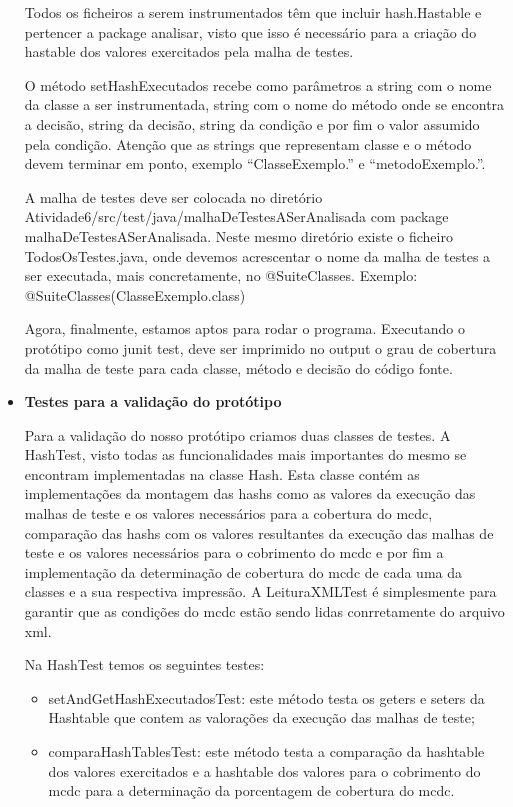 \documentclass[a4paper,11pt]{article}
\newcommand{\sepitem}{\vspace{0.1in}\item}
\begin{document}
\begin{itemize}
Todos os ficheiros a serem instrumentados têm que incluir hash.Hastable e pertencer a package analisar, 
visto que isso é necessário para a criação do hastable dos valores exercitados pela malha de testes.

O método setHashExecutados recebe como parâmetros a string com o nome da classe a ser instrumentada, 
string com o nome do método onde se encontra a decisão, string da decisão, string da condição e por fim 
o valor assumido pela condição. Atenção que as strings que representam classe e o método devem terminar 
em ponto, exemplo ``ClasseExemplo.'' e ``metodoExemplo.''.

A malha de testes deve ser colocada no diretório Atividade6/src/test/java/malhaDeTestesASerAnalisada com 
package malhaDeTestesASerAnalisada. Neste mesmo diretório existe o ficheiro TodosOsTestes.java, onde devemos
acrescentar o nome da malha de testes a ser executada, mais concretamente, no @SuiteClasses. Exemplo: 
@SuiteClasses({ClasseExemplo.class})

Agora, finalmente, estamos aptos para rodar o programa. Executando o protótipo como junit test, deve ser imprimido 
no output o grau de cobertura da malha de teste para cada classe, método e decisão do código fonte.   

\sepitem \textbf{Testes para a validação do protótipo}
\setlength{\parindent}{5ex}

Para a validação do nosso protótipo criamos duas classes de testes. A HashTest, visto todas as funcionalidades 
mais importantes do mesmo se encontram implementadas na classe Hash. Esta classe contém as implementações da 
montagem das hashs como as valores da execução das malhas de teste e os valores necessários para a cobertura do
mcdc, comparação das hashs com os valores resultantes da execução das malhas de teste e os valores necessários 
para o cobrimento do mcdc e por fim a implementação da determinação de cobertura do mcdc de cada uma da classes
e a sua respectiva impressão. A LeituraXMLTest é simplesmente para garantir que as condições do mcdc estão sendo
lidas conrretamente do arquivo xml.

Na HashTest temos os seguintes testes:
\begin{itemize}
\item setAndGetHashExecutadosTest: este método testa os geters e seters da Hashtable que contem as valorações da 
execução das malhas de teste;
\item comparaHashTablesTest: este método testa a comparação da hashtable dos valores exercitados e a hashtable dos
valores para o cobrimento do mcdc para a determinação da porcentagem de cobertura do mcdc. 
\end{itemize}


\end{itemize}
\end{document}
